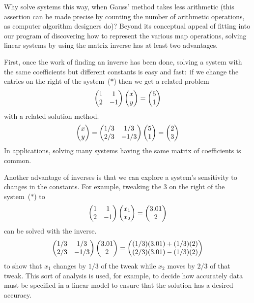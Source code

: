 \begin{remark}
Why solve systems this way, when
Gauss' method takes less arithmetic
(this assertion can be made precise by counting the 
number of arithmetic operations,
as computer algorithm designers do)? 
Beyond its conceptual appeal of fitting into our program of
discovering how to represent the various map operations,
solving linear systems by using the matrix inverse has 
at least two advantages.

First, once the work of finding an inverse has been done, 
solving a system with the
same coefficients but different constants is easy and fast:~if
we change the entries on the right of the system~($*$) 
then we get a related problem
\begin{equation*}
    \begin{pmatrix}
       1  &1  \\
       2  &-1
    \end{pmatrix}
  \begin{pmatrix} x \\ y \end{pmatrix}
  =
  \begin{pmatrix} 5 \\ 1 \end{pmatrix}
\end{equation*}
with a related solution method.
\begin{equation*}
  \begin{pmatrix} x \\ y \end{pmatrix}
  =
    \begin{pmatrix}
       1/3  &1/3  \\
       2/3  &-1/3
    \end{pmatrix}
  \begin{pmatrix} 5 \\ 1 \end{pmatrix}
  =
  \begin{pmatrix} 2 \\ 3 \end{pmatrix}
\end{equation*}
In applications, solving many systems having the same matrix of
coefficients is common.

Another advantage of inverses is that we can 
explore a system's sensitivity to changes in the constants.
For example, tweaking the $3$ on the right of the system~($*$) to
\begin{equation*}
    \begin{pmatrix}
       1  &1  \\
       2  &-1
    \end{pmatrix}
  \begin{pmatrix} x_1 \\ x_2 \end{pmatrix}
  =
  \begin{pmatrix} 3.01 \\ 2 \end{pmatrix}
\end{equation*}
can be solved with the inverse.
\begin{equation*}
    \begin{pmatrix}
       1/3  &1/3  \\
       2/3  &-1/3
    \end{pmatrix}
  \begin{pmatrix} 3.01 \\ 2 \end{pmatrix}
  =
  \begin{pmatrix} (1/3)(3.01)+(1/3)(2) \\ (2/3)(3.01)-(1/3)(2) \end{pmatrix}
\end{equation*}
to show that \( x_1 \) changes by \( 1/3 \) of the tweak while
\( x_2 \) moves by \( 2/3 \) of that tweak.
This sort of analysis is used, for example, to decide how accurately
data must be specified in a linear model to ensure that the solution has
a desired accuracy.
\end{remark}

